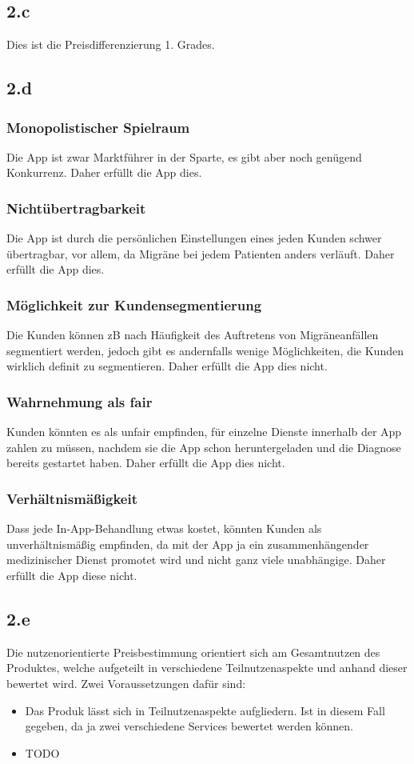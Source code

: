 \documentclass{article}
\begin{document}
\subsection{2.c}
Dies ist die Preisdifferenzierung  1. Grades.

\subsection{2.d}
\subsubsection{Monopolistischer Spielraum}
Die App ist zwar Marktführer in der Sparte, es gibt aber noch genügend Konkurrenz. Daher erfüllt die App dies.
\subsubsection{Nichtübertragbarkeit}
Die App ist durch die persönlichen Einstellungen eines jeden Kunden schwer übertragbar, vor allem, da Migräne bei jedem Patienten anders verläuft. Daher erfüllt die App dies.
\subsubsection{Möglichkeit zur Kundensegmentierung}
Die Kunden können zB nach Häufigkeit des Auftretens von Migräneanfällen segmentiert werden, jedoch gibt es andernfalls wenige Möglichkeiten, die Kunden wirklich definit zu segmentieren. Daher erfüllt die App dies nicht.
\subsubsection{Wahrnehmung als fair}
Kunden könnten es als unfair empfinden, für einzelne Dienste innerhalb der App zahlen zu müssen, nachdem sie die App schon heruntergeladen und die Diagnose bereits gestartet haben. Daher erfüllt die App dies nicht.
\subsubsection{Verhältnismäßigkeit}
Dass jede In-App-Behandlung etwas kostet, könnten Kunden als unverhältnismäßig empfinden, da mit der App ja ein zusammenhängender medizinischer Dienst promotet wird und nicht ganz viele unabhängige. Daher erfüllt die App diese nicht.

\subsection{2.e}
Die nutzenorientierte Preisbestimmung orientiert sich am Gesamtnutzen des Produktes, welche aufgeteilt in verschiedene Teilnutzenaspekte und anhand dieser bewertet wird. Zwei Voraussetzungen dafür sind:
\begin{itemize}
	\item Das Produk lässt sich in Teilnutzenaspekte aufgliedern. Ist in diesem Fall gegeben, da ja zwei verschiedene Services bewertet werden können.
	\item TODO
\end{itemize}
\end{document}
